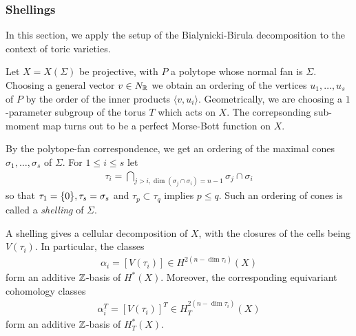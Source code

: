 \subsubsection{Shellings}
In this section, we apply the setup
of the Bialynicki-Birula decomposition to the context of toric varieties.

Let $X = X(\Sigma)$ be projective, with $P$
a polytope whose normal fan is $\Sigma$. Choosing
a general vector $v\in N_{\mathbb{R}}$ we obtain an ordering of the vertices
$u_1,\ldots,u_s$ of $P$ by the order of the inner products $\langle v,u_i\rangle$.
Geometrically, we are choosing a $1$-parameter subgroup of the torus $T$
which acts on $X$. The correpsonding sub-moment map turns out to be
a perfect Morse-Bott function on $X$.

By the polytope-fan correspondence,
we get an ordering of the maximal cones $\sigma_1,\ldots,\sigma_s$ of $\Sigma$.
For $1\leq i \leq s$ let \begin{align*}
	\tau_i = \bigcap_{j>i, \dim(\sigma_j \cap \sigma_i) = n-1} \sigma_j \cap \sigma_i
\end{align*} so that
$\tau_1 = \{0\}, \tau_s = \sigma_s$ and $\tau_p \subset \tau_q$
implies $p \leq q$. Such an ordering of cones
is called a \emph{shelling} of $\Sigma$.

\begin{proposition}
	A shelling gives a cellular decomposition of $X$, with
	the closures of the cells being $V(\tau_i)$. In particular,
	the classes \begin{align*}
		\alpha_i = [V(\tau_i)] \in H^{2(n-\dim \tau_i)}(X)
	\end{align*}
	form an additive $\mathbb{Z}$-basis of $H^*(X)$. Moreover, the
	corresponding equivariant cohomology classes \begin{align*}
		\alpha_i^T = [V(\tau_i)]^T \in H^{2(n-\dim \tau_i)}_T(X)
	\end{align*} form an additive $\mathbb{Z}$-basis of $H^*_T(X)$.
\end{proposition}


